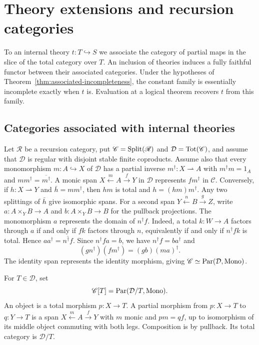 \section{Theory extensions and recursion categories}
\label{sec:theory-extensions}

To an internal theory $t:T\hookrightarrow S$ we associate the category of
partial maps in the slice of the total category over $T$.
An inclusion of theories induces a fully
faithful functor between their associated categories. Under the hypotheses of
Theorem~\ref{thm:associated-incompleteness}, the constant family is essentially
incomplete exactly when $t$ is. Evaluation at a logical theorem recovers
$t$ from this family.

\subsection{Categories associated with internal theories}

Let $\mathscr R$ be a recursion category, put
$\mathscr C=\operatorname{Split}(\mathscr R)$ and $\mathcal D=\operatorname{Tot}(\mathscr C)$,
and assume that $\mathcal D$ is regular with disjoint stable finite
coproducts. Assume also that every monomorphism $m:A\hookrightarrow X$
of $\mathcal D$ has a partial inverse $m^\dagger:X\rightharpoonup A$
with $m^\dagger m=1_A$ and $mm^\dagger=\overline{m^\dagger}$.
A monic span $X\xleftarrow{m}A\xrightarrow{f}Y$ in $\mathcal D$
represents $fm^\dagger$ in $\mathscr C$. Conversely, if
$h:X\rightharpoonup Y$ and $\bar h=mm^\dagger$, then $hm$ is total
and $h=(hm)m^\dagger$. Any two splittings of $\bar h$ give isomorphic
spans. For a second span $Y\xleftarrow{n}B\xrightarrow{g}Z$,
write $a:A\times_Y B\to A$ and $b:A\times_Y B\to B$ for the
pullback projections. The monomorphism $a$ represents the domain of
$n^\dagger f$. Indeed, a total $k:W\to A$ factors through $a$
if and only if $fk$ factors through $n$, equivalently if and only if
$n^\dagger f k$ is total. Hence $a a^\dagger=\overline{n^\dagger f}$.
Since $n^\dagger f a=b$, we have $n^\dagger f=b a^\dagger$ and
\[
 (g n^\dagger)(f m^\dagger)=(g b)(m a)^\dagger .
\]
The identity span represents the identity morphism, giving
$\mathscr C\simeq\operatorname{Par}(\mathcal D,\operatorname{Mono})$.

For $T\in\mathcal D$, set
\[
 \mathscr C[T]=\operatorname{Par}(\mathcal D/T,\operatorname{Mono}).
\]
An object is a total morphism $p:X\to T$. A partial morphism from
$p:X\to T$ to $q:Y\to T$ is a span $X\xleftarrow{m}A\xrightarrow{f}Y$
with $m$ monic and $pm=qf$, up to isomorphism of its middle object
commuting with both legs.
Composition is by pullback. Its total category is $\mathcal D/T$.

